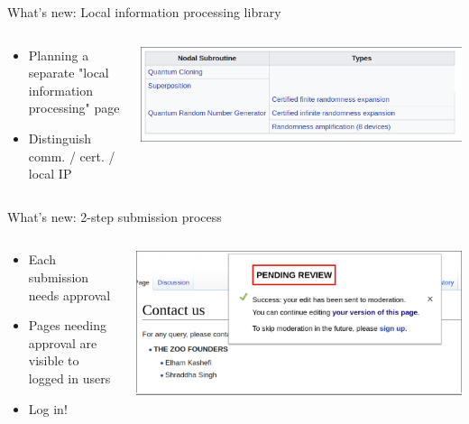 \documentclass[presentation]{beamer}
\begin{document}
\begin{frame}[label={sec:org61b430c}]{What's new: Local information processing library}
\begin{columns}
\begin{column}{0.4\columnwidth}
\begin{itemize}
\item Planning a separate "local information processing" page
\item Distinguish comm. / cert. / local IP
\end{itemize}
\end{column}
\begin{column}{0.6\columnwidth}
\begin{center}
\includegraphics[width=.9\linewidth]{./figs/wiki_subroutines.png}
\end{center}
\end{column}
\end{columns}
\end{frame}
\begin{frame}[label={sec:orgac74c0d}]{What's new: 2-step submission process}
\begin{columns}
\begin{column}{.4\columnwidth}
\begin{itemize}
\item Each submission needs approval
\item Pages needing approval are visible to logged in users
\item Log in!
\end{itemize}
\end{column}
\begin{column}{.6\columnwidth}
\begin{center}
\includegraphics[width=.9\linewidth]{./figs/wiki_submission.png}
\end{center}
\end{column}
\end{columns}
\end{frame}
\end{document}
